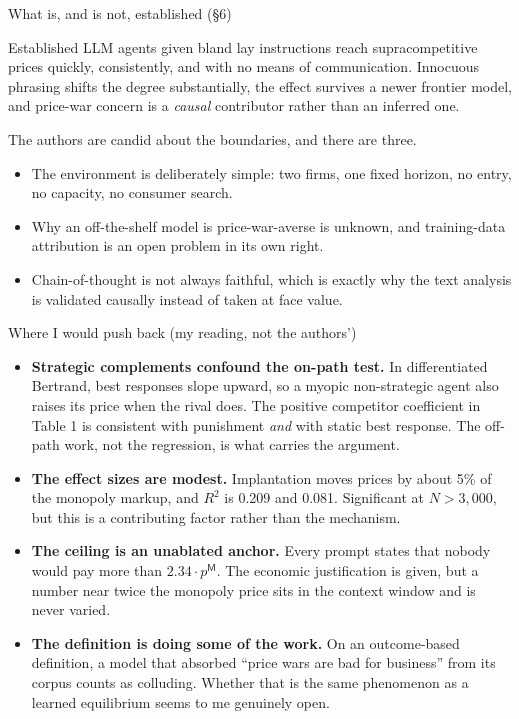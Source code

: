 \documentclass[aspectratio=169,9pt]{beamer}
\newcommand{\orange}[1]{\textcolor{AmazonOrange}{\textbf{#1}}}
\newcommand{\muted}[1]{\textcolor{EPICMuted}{#1}}
\begin{document}
\begin{frame}{What is, and is not, established \muted{(\S6)}}
\begin{block}{Established}
LLM agents given bland lay instructions reach supracompetitive prices quickly, consistently, and with no means
of communication. Innocuous phrasing shifts the degree substantially, the effect survives a newer frontier
model, and price-war concern is a \textit{causal} contributor rather than an inferred one.
\end{block}
\pause
\vspace{0.15cm}
The authors are candid about the boundaries, and there are three.
\begin{itemize}
    \item The environment is deliberately simple: two firms, one fixed horizon, no entry, no capacity, no
    consumer search.
    \pause
    \item Why an off-the-shelf model is price-war-averse is unknown, and training-data attribution is an open
    problem in its own right.
    \pause
    \item Chain-of-thought is not always faithful, which is exactly why the text analysis is validated
    causally instead of taken at face value.
\end{itemize}
\end{frame}

\begin{frame}{Where I would push back \muted{(my reading, not the authors')}}
\begin{itemize}
    \item \orange{Strategic complements confound the on-path test.} In differentiated Bertrand, best responses
    slope upward, so a myopic non-strategic agent also raises its price when the rival does. The positive
    competitor coefficient in Table 1 is consistent with punishment \textit{and} with static best response.
    The off-path work, not the regression, is what carries the argument.
    \pause
    \item \orange{The effect sizes are modest.} Implantation moves prices by about 5\% of the monopoly markup,
    and $R^2$ is 0.209 and 0.081. Significant at $N > 3{,}000$, but this is a contributing factor rather than
    the mechanism.
    \pause
    \item \orange{The ceiling is an unablated anchor.} Every prompt states that nobody would pay more than
    $2.34 \cdot p^{\mathsf{M}}$. The economic justification is given, but a number near twice the monopoly
    price sits in the context window and is never varied.
    \pause
    \item \orange{The definition is doing some of the work.} On an outcome-based definition, a model that
    absorbed ``price wars are bad for business'' from its corpus counts as colluding. Whether that is the same
    phenomenon as a learned equilibrium seems to me genuinely open.
\end{itemize}
\end{frame}
\end{document}
